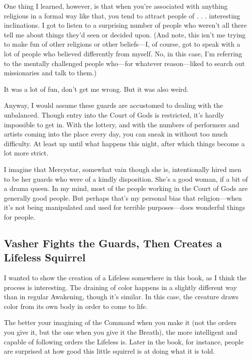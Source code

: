 One thing I learned, however, is that when you’re associated with anything religious in a formal way like that, you tend to attract people of . . . interesting inclinations. I got to listen to a surprising number of people who weren’t all there tell me about things they’d seen or decided upon. (And note, this isn’t me trying to make fun of other religions or other beliefs—I, of course, got to speak with a lot of people who believed differently from myself. No, in this case, I’m referring to the mentally challenged people who—for whatever reason—liked to search out missionaries and talk to them.)

It was a lot of fun, don’t get me wrong. But it was also weird.

Anyway, I would assume these guards are accustomed to dealing with the unbalanced. Though entry into the Court of Gods is restricted, it’s hardly impossible to get in. With the lottery, and with the numbers of performers and artists coming into the place every day, you can sneak in without too much difficulty. At least up until what happens this night, after which things become a lot more strict.

I imagine that Mercystar, somewhat vain though she is, intentionally hired men to be her guards who were of a kindly disposition. She’s a good woman, if a bit of a drama queen. In my mind, most of the people working in the Court of Gods are generally good people. But perhaps that’s my personal bias that religion—when it’s not being manipulated and used for terrible purposes—does wonderful things for people.

\subsection*{Vasher Fights the Guards, Then Creates a Lifeless Squirrel}

I wanted to show the creation of a Lifeless somewhere in this book, as I think the process is interesting. The draining of color happens in a slightly different way than in regular Awakening, though it’s similar. In this case, the creature draws color from its own body in order to come to life.

The better your imagining of the Command when you make it (not the orders you give it, but the one when you give it the Breath), the more intelligent and capable of following orders the Lifeless is. Later in the book, for instance, people are surprised at how good this little squirrel is at doing what it is told.



